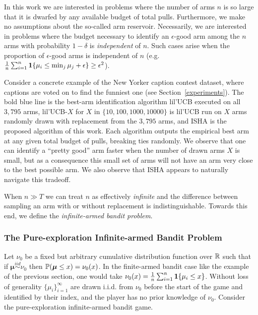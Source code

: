 In this work we are interested in problems where the number of arms $n$ is so large that it is dwarfed by any available budget of total pulls. Furthermore, we make no assumptions about the so-called arm reservoir.
Necessarily, we are interested in problems where the budget necessary to identify an $\epsilon$-good arm among the $n$ arms with probability $1-\delta$ is \emph{independent} of $n$. 
Such cases arise when the proportion of $\epsilon$-good arms is independent of $n$ (e.g. $\frac{1}{n} \sum_{i=1}^n \1\{ \mu_i \leq \min_j \mu_j + \epsilon\} \geq \epsilon^2$).

Consider a concrete example of the New Yorker caption contest dataset,
where captions are voted on to find the funniest one (see Section~\ref{experiments}).
The bold blue line is the best-arm identification algorithm lil'UCB \citep{Jamieson2014lilU} executed on all $3,795$ arms, lil'UCB-$X$ for $X$ in $\{10,100,1000,10000\}$ is lil'UCB run on $X$ arms randomly drawn with replacement from the $3,795$ arms, and ISHA is the proposed algorithm of this work. Each algorithm outputs the empirical best arm at any given total budget of pulls, breaking ties randomly.
We observe that one can identify a ``pretty good'' arm faster when the number of drawn arms $X$ is small, but as a consequence this small set of arms will not have an arm very close to the best possible arm.
We also observe that ISHA appears to naturally navigate this tradeoff.  

When $n \gg T$ we can treat $n$ as effectively \emph{infinite} and the difference between sampling an arm with or without replacement is indistinguishable. 
Towards this end, we define the \emph{infinite-armed bandit problem}.

\subsubsection{The Pure-exploration Infinite-armed Bandit Problem}
Let $\nu_0$ be a fixed but arbitrary cumulative distribution function over $\R$ such that if $\boldsymbol{\mu} \overset{iid}{\sim} \nu_0$ then $\P(\boldsymbol{\mu} \leq x) = \nu_0(x)$. 
In the finite-armed bandit case like the example of the previous section, one would take $\nu_0(x) = \frac{1}{n} \sum_{i=1}^n \1\{\mu_i \leq x \}$.
Without loss of generality $\{\mu_i\}_{i=1}^\infty$ are drawn i.i.d. from $\nu_0$ before the start of the game and identified by their index, and the player has no prior knowledge of $\nu_0$.
Consider the pure-exploration infinite-armed bandit game.

